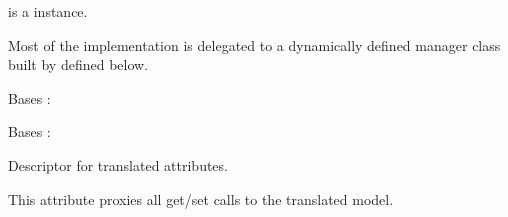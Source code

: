 \documentclass[letterpaper,10pt,french]{sphinxmanual}
\begin{document}
\begin{fulllineitems}
\begin{fulllineitems}
\sphinxAtStartPar
{} is a  instance.

\sphinxAtStartPar
Most of the implementation is delegated to a dynamically defined manager
class built by  defined below.

\end{fulllineitems}


\begin{fulllineitems}
\label{\detokenize{index:bookings.models.OtherPrice.DoesNotExist}}
\pysigstartsignatures
\pysigline
{}
\pysigstopsignatures
\sphinxAtStartPar
Bases : 

\end{fulllineitems}


\begin{fulllineitems}
\label{\detokenize{index:bookings.models.OtherPrice.MultipleObjectsReturned}}
\pysigstartsignatures
\pysigline
{}
\pysigstopsignatures
\sphinxAtStartPar
Bases : 

\end{fulllineitems}


\begin{fulllineitems}
\label{\detokenize{index:bookings.models.OtherPrice.current_year}}
\pysigstartsignatures
\pysigline
{}
\pysigstopsignatures
\sphinxAtStartPar
Descriptor for translated attributes.

\sphinxAtStartPar
This attribute proxies all get/set calls to the translated model.

\end{fulllineitems}



\end{fulllineitems}
\end{document}
